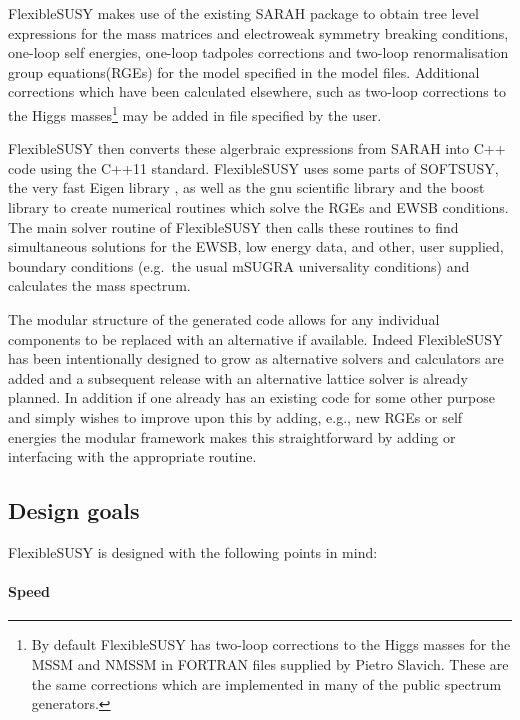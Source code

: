\documentclass[final,3p,11pt,pdflatex]{elsarticle}
\newcommand{\sarah}{SARAH\xspace}
\newcommand{\fs}{FlexibleSUSY\xspace}
\begin{document}
\fs makes use of the existing \sarah package
\cite{Staub:2010ty,Staub:2009bi,Staub:2010jh,Staub:2012pb,Staub:2013tta}
to obtain tree level expressions for the mass matrices and electroweak
symmetry breaking conditions, one-loop self energies, one-loop
tadpoles corrections and two-loop renormalisation group
equations(RGEs) for the model specified in the model files. Additional
corrections which have been calculated elsewhere, such as two-loop
corrections to the Higgs masses\footnote{By default FlexibleSUSY has
  two-loop corrections to the Higgs masses for the
  MSSM\cite{Degrassi:2001yf,Brignole:2001jy,Dedes:2002dy,Brignole:2002bz,Dedes:2003km}
  and NMSSM \cite{Degrassi:2009yq} in FORTRAN files supplied by Pietro
  Slavich. These are the same corrections which are implemented in
  many of the public spectrum generators.} may be added in file
specified by the user.

\fs then converts these algerbraic expressions from \sarah into C++
code using the C++11 standard. \fs uses some parts of
SOFTSUSY\cite{Allanach:2001kg}, the very fast Eigen library
\cite{eigen}, as well as the gnu scientific library and the boost
library to create numerical routines which solve the RGEs and EWSB
conditions.  The main solver routine of \fs then calls these routines
to find simultaneous solutions for the EWSB, low energy data, and
other, user supplied, boundary conditions (e.g.\ the usual mSUGRA
universality conditions) and calculates the mass spectrum.

The modular structure of the generated code allows for any individual
components to be replaced with an alternative if available.  Indeed
\fs has been intentionally designed to grow as alternative solvers and
calculators are added and a subsequent release with an alternative
lattice solver is already planned.  In addition if one already has an
existing code for some other purpose and simply wishes to improve upon
this by adding, e.g., new RGEs or self energies the modular framework
makes this straightforward by adding or interfacing with the
appropriate routine.

\subsection{Design goals}

FlexibleSUSY is designed with the following points in mind:

\paragraph{Speed}
\end{document}
